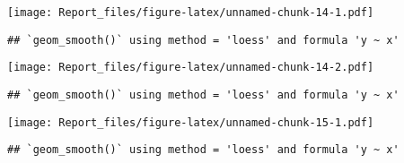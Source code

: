 \documentclass[]{article}
\newenvironment{Shaded}{\begin{snugshade}}{\end{snugshade}}
\newcommand{\KeywordTok}[1]{\textcolor[rgb]{0.13,0.29,0.53}{\textbf{#1}}}
\newcommand{\DataTypeTok}[1]{\textcolor[rgb]{0.13,0.29,0.53}{#1}}
\newcommand{\StringTok}[1]{\textcolor[rgb]{0.31,0.60,0.02}{#1}}
\newcommand{\OperatorTok}[1]{\textcolor[rgb]{0.81,0.36,0.00}{\textbf{#1}}}
\newcommand{\NormalTok}[1]{#1}
\begin{document}
\texttt{[image: Report\_files/figure-latex/unnamed-chunk-14-1.pdf]}

\begin{Shaded}
\end{Shaded}

\begin{verbatim}
## `geom_smooth()` using method = 'loess' and formula 'y ~ x'
\end{verbatim}

\texttt{[image: Report\_files/figure-latex/unnamed-chunk-14-2.pdf]}

\begin{Shaded}
\end{Shaded}

\begin{verbatim}
## `geom_smooth()` using method = 'loess' and formula 'y ~ x'
\end{verbatim}

\texttt{[image: Report\_files/figure-latex/unnamed-chunk-15-1.pdf]}

\begin{Shaded}
\end{Shaded}

\begin{verbatim}
## `geom_smooth()` using method = 'loess' and formula 'y ~ x'
\end{verbatim}
\end{document}
